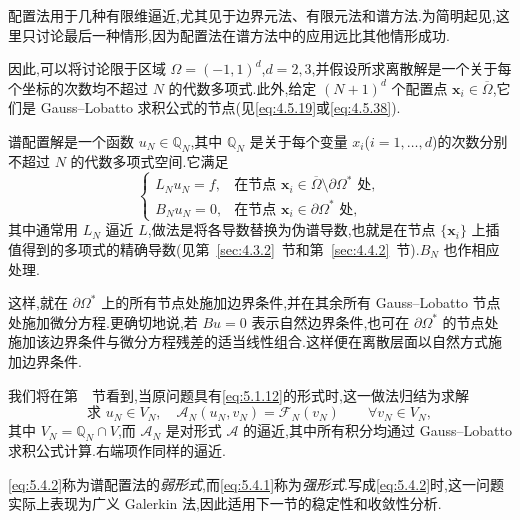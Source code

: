 配置法用于几种有限维逼近,尤其见于边界元法、有限元法和谱方法.为简明起见,这里只讨论最后一种情形,因为配置法在谱方法中的应用远比其他情形成功.

因此,可以将讨论限于区域 \(\Omega=(-1,1)^d\),\(d=2,3\),并假设所求离散解是一个关于每个坐标的次数均不超过 \(N\) 的代数多项式.此外,给定 \((N+1)^d\) 个配置点 \(\boldsymbol{x}_i\in\overline\Omega\),它们是 Gauss--Lobatto 求积公式的节点(见\eqref{eq:4.5.19}或\eqref{eq:4.5.38}).

谱配置解是一个函数 \(u_N\in\mathbb Q_N\),其中 \(\mathbb Q_N\) 是关于每个变量 \(x_i\)(\(i=1,\ldots,d\))的次数分别不超过 \(N\) 的代数多项式空间.它满足
\begin{equation}\label{eq:5.4.1}
  \begin{cases}
    L_Nu_N=f,&\text{在节点 }\boldsymbol{x}_i\in\overline\Omega\setminus\partial\Omega^*\text{ 处},\\
    B_Nu_N=0,&\text{在节点 }\boldsymbol{x}_i\in\partial\Omega^*\text{ 处},
  \end{cases}
\end{equation}
其中通常用 \(L_N\) 逼近 \(L\),做法是将各导数替换为伪谱导数,也就是在节点 \(\{\boldsymbol{x}_i\}\) 上插值得到的多项式的精确导数(见第~\ref{sec:4.3.2}~节和第~\ref{sec:4.4.2}~节).\(B_N\) 也作相应处理.

这样,就在 \(\partial\Omega^*\) 上的所有节点处施加边界条件,并在其余所有 Gauss--Lobatto 节点处施加微分方程.更确切地说,若 \(Bu=0\) 表示自然边界条件,也可在 \(\partial\Omega^*\) 的节点处施加该边界条件与微分方程残差的适当线性组合.这样便在离散层面以自然方式施加边界条件.

我们将在第~~节看到,当原问题具有\eqref{eq:5.1.12}的形式时,这一做法归结为求解
\begin{equation}\label{eq:5.4.2}
  \text{求 }u_N\in V_N,\quad
   \mathcal A_N(u_N,v_N)=\mathcal F_N(v_N)\qquad\forall v_N\in V_N,
\end{equation}
其中 \(V_N=\mathbb Q_N\cap V\),而 \(\mathcal A_N\) 是对形式 \(\mathcal A\) 的逼近,其中所有积分均通过 Gauss--Lobatto 求积公式计算.右端项作同样的逼近.

\eqref{eq:5.4.2}称为谱配置法的\emph{弱形式},而\eqref{eq:5.4.1}称为\emph{强形式}.写成\eqref{eq:5.4.2}时,这一问题实际上表现为广义 Galerkin 法,因此适用下一节的稳定性和收敛性分析.

